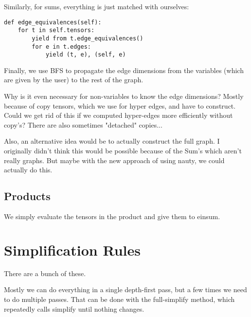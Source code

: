 Similarly, for sums, everything is just matched with ourselves:
\begin{lstlisting}
def edge_equivalences(self):
    for t in self.tensors:
        yield from t.edge_equivalences()
        for e in t.edges:
            yield (t, e), (self, e)
\end{lstlisting}

Finally, we use BFS to propagate the edge dimensions from the variables (which are given by the user) to the rest of the graph.

Why is it even necessary for non-variables to know the edge dimensions?
Mostly because of copy tensors, which we use for hyper edges, and have to construct.
Could we get rid of this if we computed hyper-edges more efficiently without copy's?
There are also sometimes "detached" copies...

Also, an alternative idea would be to actually construct the full graph.
I originally didn't think this would be possible because of the Sum's which aren't really graphs.
But maybe with the new approach of using nauty, we could actually do this.

\subsection{Products}
We simply evaluate the tensors in the product and give them to einsum.


\section{Simplification Rules}
There are a bunch of these.

Mostly we can do everything in a single depth-first pass,
but a few times we need to do multiple passes.
That can be done with the full-simplify method, which repeatedly calls simplify until nothing changes.
